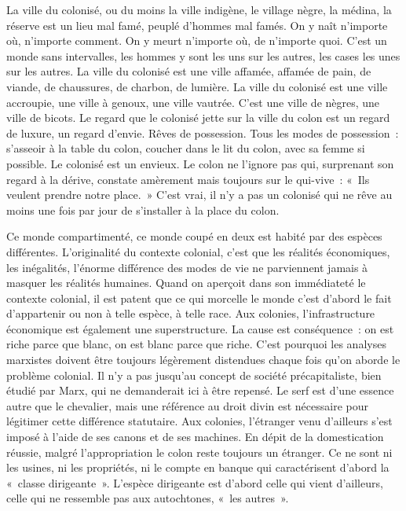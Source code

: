 \documentclass[french,twoside]{book} %
\begin{document}
La ville du colonisé, ou du moins la ville indigène, le village nègre, la médina, la réserve est un lieu mal famé, peuplé d’hommes mal famés. On y naît n’importe où, n’importe comment. On y meurt n’importe où, de n’importe quoi. C’est un monde sans intervalles, les hommes y sont les uns sur les autres,   les cases les unes sur les autres. La ville du colonisé est une ville affamée, affamée de pain, de viande, de chaussures, de charbon, de lumière. La ville du colonisé est une ville accroupie, une ville à genoux, une ville vautrée. C’est une ville de nègres, une ville de bicots. Le regard que le colonisé jette sur la ville du colon est un regard de luxure, un regard d’envie. Rêves de possession. Tous les modes de possession : s’asseoir à la table du colon, coucher dans le lit du colon, avec sa femme si possible. Le colonisé est un envieux. Le colon ne l’ignore pas qui, surprenant son regard à la dérive, constate amèrement mais toujours sur le qui-vive : « Ils veulent prendre notre place. » C’est vrai, il n’y a pas un colonisé qui ne rêve au moins une fois par jour de s’installer à la place du colon.\par
Ce monde compartimenté, ce monde coupé en deux est habité par des espèces différentes. L’originalité du contexte colonial, c’est que les réalités économiques, les inégalités, l’énorme différence des modes de vie ne parviennent jamais à masquer les réalités humaines. Quand on aperçoit dans son immédiateté le contexte colonial, il est patent que ce qui morcelle le monde c’est d’abord le fait d’appartenir ou non à telle espèce, à telle race. Aux colonies, l’infrastructure économique est également une superstructure. La cause est conséquence : on est riche parce que blanc, on est blanc parce que riche. C’est pourquoi les analyses marxistes doivent être toujours légèrement distendues chaque fois qu’on aborde le problème colonial. Il n’y a pas jusqu’au concept de société précapitaliste, bien étudié par Marx, qui ne demanderait ici à être repensé. Le serf est d’une essence autre que le chevalier, mais une référence au droit divin est nécessaire pour légitimer cette différence statutaire. Aux colonies, l’étranger venu d’ailleurs s’est imposé à l’aide de ses canons et de ses machines. En dépit de la domestication réussie, malgré l’appropriation le colon reste toujours un étranger. Ce ne sont ni les usines, ni les propriétés, ni le compte en banque qui caractérisent d’abord la « classe dirigeante ». L’espèce dirigeante est d’abord celle qui vient d’ailleurs, celle qui ne ressemble pas aux autochtones, « les autres ».\par
\end{document}
